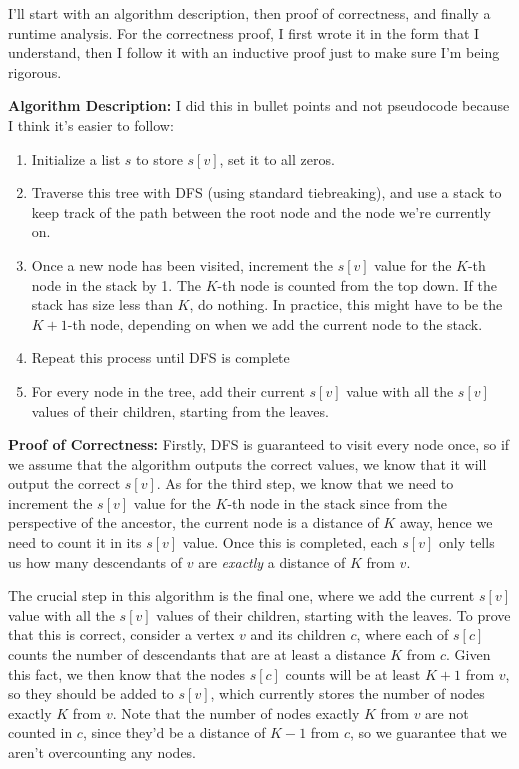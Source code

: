 \documentclass[10.5pt]{article}
\begin{document}
\begin{solution}
	I'll start with an algorithm description, then proof of correctness, and finally a runtime analysis. For 
	the correctness proof, I first wrote it in the form that I understand, then I follow it with an 
	inductive proof just to make sure I'm being rigorous.

	\textbf{Algorithm Description:} I did this in bullet points and not pseudocode because I think it's 
	easier to follow:
	\begin{enumerate}
		\item Initialize a list $s$ to store $s[v]$, set it to all zeros.    
		\item Traverse this tree with DFS (using standard tiebreaking), and use a stack to
			keep track of the path between the root node 
			and the node we're currently on. 
		\item Once a new node has been visited, increment the $s[v]$ value for the 
			$K$-th node in the stack by 1. The $K$-th node is counted from the top down. If the stack has 
			size less than $K$, do nothing. In practice, this might have to be the $K+1$-th node, 
			depending on when we add the current node to the stack.
		\item Repeat this process until DFS is complete
		\item For every node in the tree, add their current $s[v]$ value with all the $s[v]$ values of 
			their children, starting from the leaves.
	\end{enumerate}

	\textbf{Proof of Correctness:} Firstly, DFS is guaranteed to visit every node once, so if we assume that 
	the algorithm outputs the correct values, we know that it will output the correct $s[v]$. As for the 
	third step, we know that we need to increment the $s[v]$ value for the $K$-th node in the stack since 
	from the perspective of the ancestor, the current node is a distance of $K$ away, hence we need to count 
	it in its $s[v]$ value. Once this is completed, each $s[v]$ only tells us how many descendants of $v$ are 
	\textit{exactly} a distance of $K$ from $v$. 

	The crucial step in this algorithm is the final one, where we add the current $s[v]$ value with all 
	the $s[v]$ values of their children, starting with the leaves. To prove that this is correct, consider 
	a vertex $v$ and its children $c$, where each of $s[c]$ counts the number of descendants that are at least 
	a distance $K$ from $c$. Given this fact, we then know that the nodes $s[c]$ counts will be at least
	$K+1$ from $v$, so they should be added to $s[v]$, which currently stores the number of nodes exactly 
	$K$ from $v$. Note that the number of nodes exactly $K$ from $v$ are not counted in $c$, since they'd be 
	a distance of $K-1$ from $c$, so we guarantee that we aren't overcounting any nodes.


\end{solution}
\end{document}
